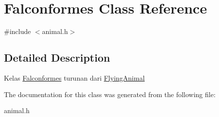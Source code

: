 \hypertarget{classFalconformes}{}\section{Falconformes Class Reference}
\label{classFalconformes}


{\ttfamily \#include $<$animal.\+h$>$}



\subsection{Detailed Description}
Kelas \hyperlink{classFalconformes}{Falconformes} turunan dari \hyperlink{classFlyingAnimal}{Flying\+Animal} 

The documentation for this class was generated from the following file\+:\begin{DoxyCompactItemize}
\item 
animal.\+h\end{DoxyCompactItemize}
